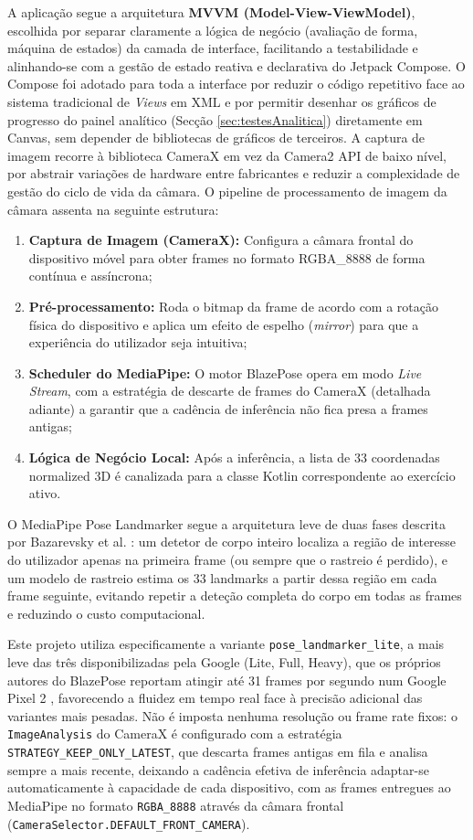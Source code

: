 A aplicação segue a arquitetura \textbf{MVVM (Model-View-ViewModel)}, escolhida por separar claramente a lógica de negócio (avaliação de forma, máquina de estados) da camada de interface, facilitando a testabilidade e alinhando-se com a gestão de estado reativa e declarativa do Jetpack Compose. O Compose foi adotado para toda a interface por reduzir o código repetitivo face ao sistema tradicional de \textit{Views} em XML e por permitir desenhar os gráficos de progresso do painel analítico (Secção \ref{sec:testesAnalitica}) diretamente em Canvas, sem depender de bibliotecas de gráficos de terceiros. A captura de imagem recorre à biblioteca CameraX em vez da Camera2 API de baixo nível, por abstrair variações de hardware entre fabricantes e reduzir a complexidade de gestão do ciclo de vida da câmara. O pipeline de processamento de imagem da câmara assenta na seguinte estrutura:
\begin{enumerate}
    \item \textbf{Captura de Imagem (CameraX):} Configura a câmara frontal do dispositivo móvel para obter frames no formato RGBA\_8888 de forma contínua e assíncrona;
    \item \textbf{Pré-processamento:} Roda o bitmap da frame de acordo com a rotação física do dispositivo e aplica um efeito de espelho (\textit{mirror}) para que a experiência do utilizador seja intuitiva;
    \item \textbf{Scheduler do MediaPipe:} O motor BlazePose opera em modo \textit{Live Stream}, com a estratégia de descarte de frames do CameraX (detalhada adiante) a garantir que a cadência de inferência não fica presa a frames antigas;
    \item \textbf{Lógica de Negócio Local:} Após a inferência, a lista de 33 coordenadas normalized 3D é canalizada para a classe Kotlin correspondente ao exercício ativo.
\end{enumerate}

O MediaPipe Pose Landmarker segue a arquitetura leve de duas fases descrita por Bazarevsky et al. \cite{Bazarevsky_BlazePose_2020}: um detetor de corpo inteiro localiza a região de interesse do utilizador apenas na primeira frame (ou sempre que o rastreio é perdido), e um modelo de rastreio estima os 33 landmarks a partir dessa região em cada frame seguinte, evitando repetir a deteção completa do corpo em todas as frames e reduzindo o custo computacional.

Este projeto utiliza especificamente a variante \texttt{pose\_landmarker\_lite}, a mais leve das três disponibilizadas pela Google (Lite, Full, Heavy), que os próprios autores do BlazePose reportam atingir até 31 frames por segundo num Google Pixel 2 \cite{Bazarevsky_BlazePose_2020}, favorecendo a fluidez em tempo real face à precisão adicional das variantes mais pesadas. Não é imposta nenhuma resolução ou frame rate fixos: o \texttt{ImageAnalysis} do CameraX é configurado com a estratégia \texttt{STRATEGY\_KEEP\_ONLY\_LATEST}, que descarta frames antigas em fila e analisa sempre a mais recente, deixando a cadência efetiva de inferência adaptar-se automaticamente à capacidade de cada dispositivo, com as frames entregues ao MediaPipe no formato \texttt{RGBA\_8888} através da câmara frontal (\texttt{CameraSelector.DEFAULT\_FRONT\_CAMERA}).


